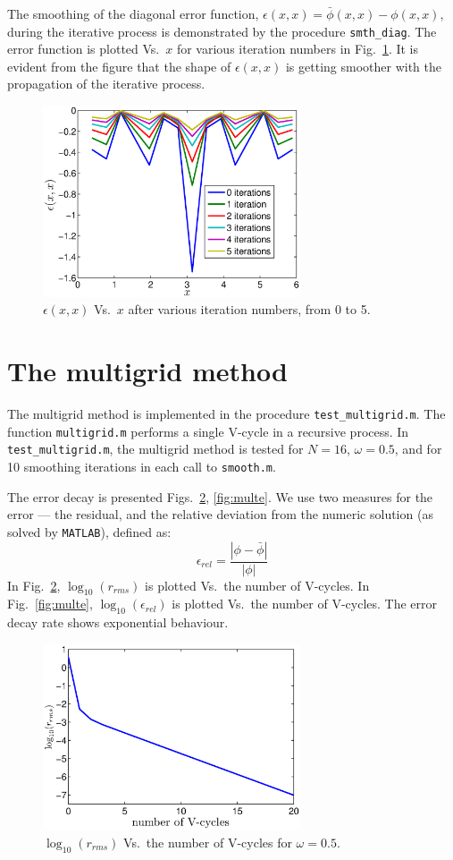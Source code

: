\documentclass[12pt, a4paper]{article}
\begin{document}
The smoothing of the diagonal error function, $\epsilon(x, x) = \bar{\phi}(x, x) - \phi(x, x)$, during the iterative process is demonstrated by the procedure \texttt{smth\_diag}. The error function is plotted Vs.~$x$ for various iteration numbers in Fig.~\ref{fig:diag}. It is evident from the figure that the shape of $\epsilon(x,x)$ is getting smoother with the propagation of the iterative process.

\begin{figure}[htb]
	\centering\includegraphics[width=3in]{smth_diag}
	\caption{$\epsilon(x, x)$ Vs.\ $x$ after various iteration numbers, from 0 to 5.}\label{fig:diag}
\end{figure}

\section{The multigrid method}

The multigrid method is implemented in the procedure \texttt{test\_multigrid.m}. The function \texttt{multigrid.m} performs a single V-cycle in a recursive process. In \texttt{test\_multigrid.m}, the multigrid method is tested for $N=16$, $\omega=0.5$, and for 10 smoothing iterations in each call to \texttt{smooth.m}.

The error decay is presented Figs.~\ref{fig:multr}, \ref{fig:multe}. We use two measures for the error --- the residual, and the relative deviation from the numeric solution (as solved by \texttt{MATLAB}), defined as:
\begin{equation}
	\epsilon_{rel} = \frac{|\phi - \bar\phi|}{|\phi|}
\end{equation}
In Fig.~\ref{fig:multr}, $\log_{10}(r_{rms})$ is plotted Vs.\ the number of V-cycles. In Fig.~\ref{fig:multe}, $\log_{10}(\epsilon_{rel})$ is plotted Vs.\ the number of V-cycles. The error decay rate shows exponential behaviour.

\begin{figure}[htb]
	\centering\includegraphics[width=3in]{multigridr}
	\caption{$\log_{10}(r_{rms})$ Vs.\ the number of V-cycles for $\omega=0.5$.}\label{fig:multr}
\end{figure}
\end{document}
